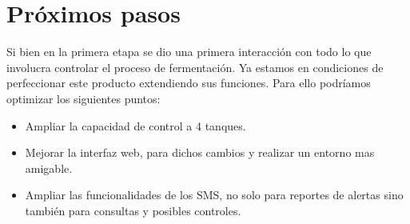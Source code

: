 \section{Próximos pasos}

Si bien en la primera etapa se dio una primera interacción con todo lo que involucra controlar el proceso de fermentación. Ya estamos en condiciones de perfeccionar este producto extendiendo sus funciones.
Para ello podríamos optimizar los siguientes puntos:
  \begin{itemize}
    \item Ampliar la capacidad de control a 4 tanques.
    \item Mejorar la interfaz web, para dichos cambios y realizar un entorno mas amigable.
    \item Ampliar las funcionalidades de los SMS, no solo para reportes de alertas sino también para consultas y posibles controles. 
   \end{itemize} 


